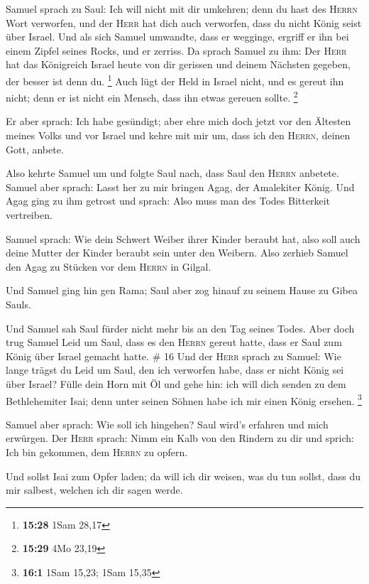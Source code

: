  Samuel sprach zu Saul: Ich will nicht mit dir umkehren;
denn du hast des \textsc{Herrn} Wort verworfen, und der \textsc{Herr}
hat dich auch verworfen, dass du nicht König seist über Israel.
 Und als sich Samuel umwandte, dass er wegginge, ergriff
er ihn bei einem Zipfel seines Rocks, und er zerriss.  Da
sprach Samuel zu ihm: Der \textsc{Herr} hat das Königreich Israel heute
von dir gerissen und deinem Nächsten gegeben, der besser ist denn du.
\footnote{\textbf{15:28} 1Sam 28,17}  Auch lügt der Held
in Israel nicht, und es gereut ihn nicht; denn er ist nicht ein Mensch,
dass ihn etwas gereuen sollte. \footnote{\textbf{15:29} 4Mo 23,19}

 Er aber sprach: Ich habe gesündigt; aber ehre mich doch
jetzt vor den Ältesten meines Volks und vor Israel und kehre mit mir um,
dass ich den \textsc{Herrn}, deinen Gott, anbete.

 Also kehrte Samuel um und folgte Saul nach, dass Saul
den \textsc{Herrn} anbetete.  Samuel aber sprach: Lasst
her zu mir bringen Agag, der Amalekiter König. Und Agag ging zu ihm
getrost und sprach: Also muss man des Todes Bitterkeit vertreiben.

 Samuel sprach: Wie dein Schwert Weiber ihrer Kinder
beraubt hat, also soll auch deine Mutter der Kinder beraubt sein unter
den Weibern. Also zerhieb Samuel den Agag zu Stücken vor dem
\textsc{Herrn} in Gilgal.

 Und Samuel ging hin gen Rama; Saul aber zog hinauf zu
seinem Hause zu Gibea Sauls.

 Und Samuel sah Saul fürder nicht mehr bis an den Tag
seines Todes. Aber doch trug Samuel Leid um Saul, dass es den
\textsc{Herrn} gereut hatte, dass er Saul zum König über Israel gemacht
hatte. \# 16  Und der \textsc{Herr} sprach zu Samuel: Wie
lange trägst du Leid um Saul, den ich verworfen habe, dass er nicht
König sei über Israel? Fülle dein Horn mit Öl und gehe hin: ich will
dich senden zu dem Bethlehemiter Isai; denn unter seinen Söhnen habe ich
mir einen König ersehen. \footnote{\textbf{16:1} 1Sam 15,23; 1Sam 15,35}

 Samuel aber sprach: Wie soll ich hingehen? Saul wird's
erfahren und mich erwürgen. Der \textsc{Herr} sprach: Nimm ein Kalb von
den Rindern zu dir und sprich: Ich bin gekommen, dem \textsc{Herrn} zu
opfern.

 Und sollst Isai zum Opfer laden; da will ich dir weisen,
was du tun sollst, dass du mir salbest, welchen ich dir sagen werde.

